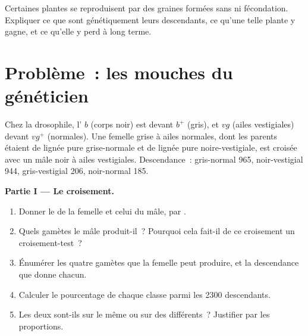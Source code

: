\begin{exercise}[$\star\star\star$]\label{exo:g12:meiosis-genetic-shuffling:15}
Certaines plantes se reproduisent par des graines formées sans 
ni fécondation. Expliquer ce que sont génétiquement leurs descendants,
ce qu'une telle plante y gagne, et ce qu'elle y perd à long terme.
\end{exercise}

\section{Problème~: les mouches du généticien}

\begin{problem}
\label{pb:g12:meiosis-genetic-shuffling:1}
Chez la drosophile, l' $b$ (corps noir) est  devant
$b^+$ (gris), et $vg$ (ailes vestigiales)  devant $vg^+$
(normales). Une femelle grise à ailes normales, dont les parents
étaient de lignée pure grise-normale et de lignée pure
noire-vestigiale, est croisée avec un mâle noir à ailes vestigiales.
Descendance~: gris-normal 965, noir-vestigial 944, gris-vestigial 206,
noir-normal 185.

\medskip
\noindent\textbf{Partie I --- Le croisement.}
\begin{enumerate}
  \item Donner le  de la femelle et celui du mâle,  par
        .
  \item Quels gamètes le mâle produit-il~? Pourquoi cela fait-il de ce
        croisement un croisement-test~?
  \item Énumérer les quatre gamètes que la femelle peut produire, et la
        descendance que donne chacun.
  \item Calculer le pourcentage de chaque classe parmi les 2300
        descendants.
  \item Les deux  sont-ils sur le même  ou sur des
         différents~? Justifier par les proportions.
\end{enumerate}


\end{problem}
